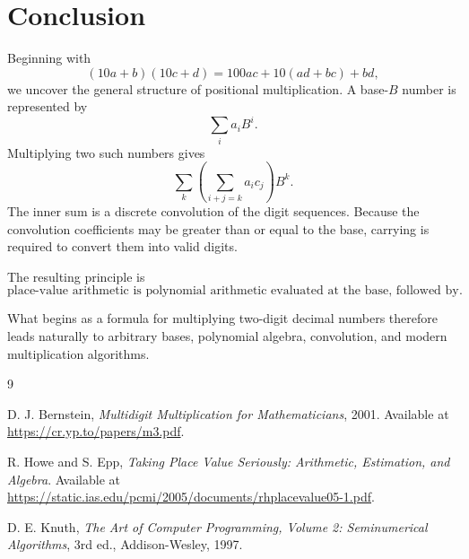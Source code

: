 \documentclass[11pt]{article}
\begin{document}
\section{Conclusion}

Beginning with
\[
(10a+b)(10c+d)=100ac+10(ad+bc)+bd,
\]
we uncover the general structure of positional multiplication. A base-$B$ number is represented by
\[
\sum_i a_iB^i.
\]
Multiplying two such numbers gives
\[
\sum_k\left(\sum_{i+j=k}a_ic_j\right)B^k.
\]
The inner sum is a discrete convolution of the digit sequences. Because the convolution coefficients may be greater than or equal to the base, carrying is required to convert them into valid digits.

The resulting principle is
\[
\boxed{
\text{place-value arithmetic is polynomial arithmetic evaluated at the base, followed by carrying}
}.
\]

What begins as a formula for multiplying two-digit decimal numbers therefore leads naturally to arbitrary bases, polynomial algebra, convolution, and modern multiplication algorithms.

\begin{thebibliography}{9}

D. J. Bernstein,
\emph{Multidigit Multiplication for Mathematicians}, 2001.
Available at \url{https://cr.yp.to/papers/m3.pdf}.

R. Howe and S. Epp,
\emph{Taking Place Value Seriously: Arithmetic, Estimation, and Algebra}.
Available at \url{https://static.ias.edu/pcmi/2005/documents/rhplacevalue05-1.pdf}.

D. E. Knuth,
\emph{The Art of Computer Programming, Volume 2: Seminumerical Algorithms},
3rd ed., Addison-Wesley, 1997.

\end{thebibliography}
\end{document}
